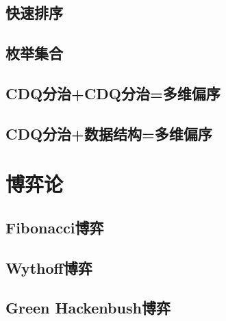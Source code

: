 \documentclass[twocolumn,a4]{article}  %
\begin{document}
	 	\subsection{快速排序}
	 	 	
	 	 	
 	 	\subsection{枚举集合}
	 	 	
	 	 	
	 	\subsection{CDQ分治+CDQ分治=多维偏序}
	 	 	

		\subsection{CDQ分治+数据结构=多维偏序}
	 	 	
	
	\section{博弈论}
		\subsection{Fibonacci博弈}
	 	 	
	 	 	
		\subsection{Wythoff博弈}
	 	 	
	 	 	
		\subsection{Green Hackenbush博弈}
	 	 	
\end{document}
